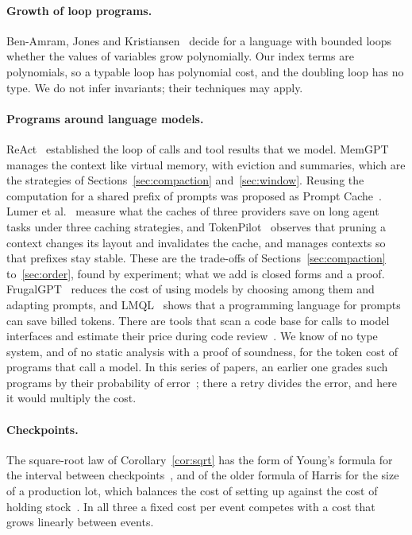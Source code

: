 \documentclass[acmsmall,nonacm,screen]{acmart}
\begin{document}
\paragraph{Growth of loop programs.} Ben-Amram, Jones and Kristiansen~\cite{benamram2008}
decide for a language with bounded loops whether the values of variables grow polynomially.
Our index terms are polynomials, so a typable loop has polynomial cost, and the doubling loop
has no type. We do not infer invariants; their techniques may apply.

\paragraph{Programs around language models.} ReAct~\cite{yao2022} established the loop of
calls and tool results that we model. MemGPT~\cite{packer2023} manages the context like
virtual memory, with eviction and summaries, which are the strategies of
Sections~\ref{sec:compaction} and~\ref{sec:window}. Reusing the computation for a shared
prefix of prompts was proposed as Prompt Cache~\cite{gim2023}. Lumer et
al.~\cite{lumer2026} measure what the caches of three providers save on long agent tasks
under three caching strategies, and TokenPilot~\cite{xu2026} observes that pruning a context
changes its layout and invalidates the cache, and manages contexts so that prefixes stay
stable. These are the trade-offs of Sections~\ref{sec:compaction} to~\ref{sec:order}, found
by experiment; what we add is closed forms and a proof. FrugalGPT~\cite{chen2023} reduces
the cost of using models by choosing among them and adapting prompts, and
LMQL~\cite{lmql2023} shows that a programming language for prompts can save billed tokens.
There are tools that scan a code base for calls to model interfaces and estimate their price
during code review~\cite{tokentoll}. We know of no type system, and of no static analysis
with a proof of soundness, for the token cost of programs that call a model. In this series of papers, an earlier one grades such programs by their probability
of error~\cite{tpp3}; there a retry divides the error, and here it would multiply the cost.

\paragraph{Checkpoints.} The square-root law of Corollary~\ref{cor:sqrt} has the form of
Young's formula for the interval between checkpoints~\cite{young1974}, and of the older
formula of Harris for the size of a production lot, which balances the cost of setting up
against the cost of holding stock~\cite{harris1990}. In all
three a fixed cost per event competes with a cost that grows linearly between events.
\end{document}
